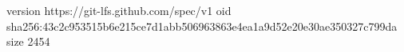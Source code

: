 version https://git-lfs.github.com/spec/v1
oid sha256:43c2c953515b6e215ce7d1abb506963863e4ea1a9d52e20e30ae350327c799da
size 2454
